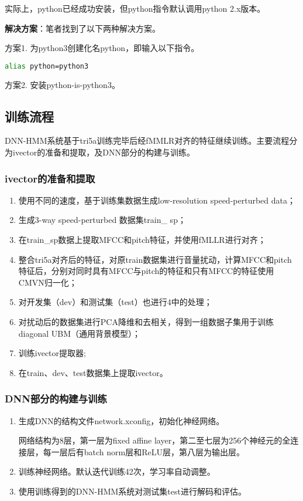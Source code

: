 \documentclass[a4paper]{article}
\begin{document}
实际上，python已经成功安装，但python指令默认调用python 2.x版本。

\vspace{1em} \hspace{-2.2em}
\textbf{解决方案}：笔者找到了以下两种解决方案。

方案1. 为python3创建化名python，即输入以下指令。
\begin{lstlisting}[language=bash]
alias python=python3
\end{lstlisting}

方案2. 安装python-is-python3。


\subsection{训练流程}

DNN-HMM系统基于tri5a训练完毕后经fMMLR对齐的特征继续训练。主要流程分为ivector的准备和提取，及DNN部分的构建与训练。

\subsubsection{ivector的准备和提取}

\begin{enumerate}
    \item 使用不同的速度，基于训练集数据生成low-resolution speed-perturbed data；
    \item 生成3-way speed-perturbed 数据集train\_ sp；
    \item 在train\_sp数据上提取MFCC和pitch特征，并使用fMLLR进行对齐； 
    \item 整合tri5a对齐后的特征，对原train数据集进行音量扰动，计算MFCC和pitch特征后，分别对同时具有MFCC与pitch的特征和只有MFCC的特征使用CMVN归一化；
    \item 对开发集（dev）和测试集（test）也进行4中的处理；
    \item 对扰动后的数据集进行PCA降维和去相关，得到一组数据子集用于训练diagonal UBM（通用背景模型）；
    \item 训练ivector提取器;
    \item 在train、dev、test数据集上提取ivector。
\end{enumerate}

\subsubsection{DNN部分的构建与训练}

\begin{enumerate}
    \item 生成DNN的结构文件network.xconfig，初始化神经网络。
    
    网络结构为8层，第一层为fixed affine layer，第二至七层为256个神经元的全连接层，每一层后有batch norm层和ReLU层，第八层为输出层。
    
    \item 训练神经网络。默认迭代训练42次，学习率自动调整。
    
    \item 使用训练得到的DNN-HMM系统对测试集test进行解码和评估。
\end{enumerate}
\end{document}
